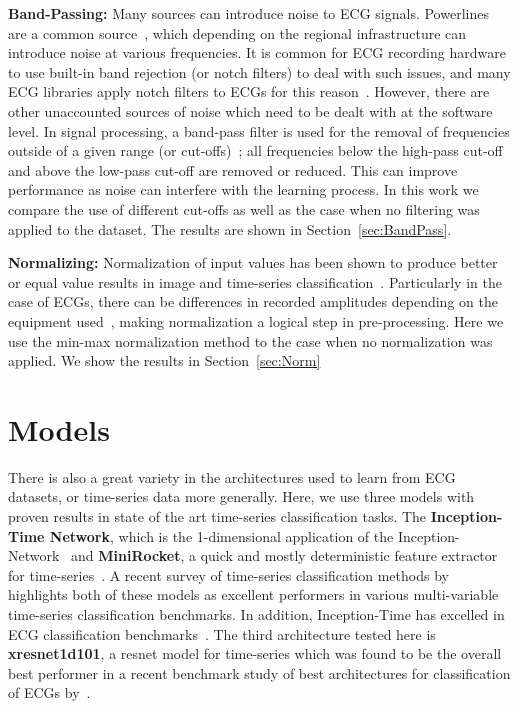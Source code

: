 \documentclass[pmlr,twocolumn]{jmlr}%
\begin{document}
\textbf{Band-Passing:}
Many sources can introduce noise to ECG signals. Powerlines are a common source~\citep{uwaechia2021comprehensive}, which depending on the regional infrastructure can introduce noise at various frequencies. It is common for ECG recording hardware to use built-in band rejection (or notch filters) to deal with such issues, and many ECG libraries apply notch filters to ECGs for this reason~\citep{Makowski2021neurokit}. However, there are other unaccounted sources of noise which need to be dealt with at the software level. In signal processing, a band-pass filter is used for the removal of frequencies outside of a given range (or cut-offs)~\citep{lyons1997understanding}; all frequencies below the high-pass cut-off and above the low-pass cut-off are removed or reduced. This can improve performance as noise can interfere with the learning process. In this work we compare the use of different cut-offs as well as the case when no filtering was applied to the dataset. The results are shown in Section~\ref{sec:BandPass}. 

\textbf{Normalizing:}
Normalization of input values has been shown to produce better or equal value results in image and time-series classification~\citep{bhanja2018impact}. Particularly in the case of ECGs, there can be differences in recorded amplitudes depending on the equipment used~\citep{uwaechia2021comprehensive}, making normalization a logical step in pre-processing. Here we use the min-max normalization method to the case when no normalization was applied. We show the results in Section~\ref{sec:Norm}

\section{Models}
There is also a great variety in the architectures used to learn from ECG datasets, or time-series data more generally. Here, we use three models with proven results in state of the art time-series classification tasks. The \textbf{Inception-Time Network}, which is the 1-dimensional application of the Inception-Network~\citep{szegedy2017inception,ismail2020inceptiontime} and \textbf{MiniRocket}, a quick and mostly deterministic feature extractor for time-series~\citep{dempster2021minirocket}. A recent survey of time-series classification methods by~\cite{ruiz2021great} highlights both of these models as excellent performers in various multi-variable time-series classification benchmarks. In addition, Inception-Time has excelled in ECG classification benchmarks~\citep{Strodthoff2021}. The third architecture tested here is \textbf{xresnet1d101}, a resnet model for time-series which was found to be the overall best performer in a recent benchmark study of best architectures for classification of ECGs by~\citet{strodthoff2020deep}.
\end{document}
